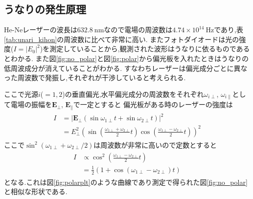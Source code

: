 \subsection{うなりの発生原理}
He-Neレーザーの波長は$632.8\ \si{\nano\metre}$なので電場の周波数は$4.74\times10^14\ \si{\hertz}$であり,表\ref{tab:unari_kihon}の周波数に比べて非常に高い.
またフォトダイオードは光の強度($I=|E_0|^2$)を測定していることから,観測された波形はうなりに依るものであるとわかる.
また図\ref{fig:no_polar}と図\ref{fig:polar}から偏光板を入れたときはうなりの低周波成分が消えていることがわかる.
すなわちレーザーは偏光成分ごとに異なった周波数で発振し,それぞれが干渉していると考えられる.

ここで光源$i$($=1,2$)の垂直偏光,水平偏光成分の周波数をそれぞれ$\omega_{i\perp}$, $\omega_{i\parallel}$として電場の振幅を$\bm{E}_\perp$, $\bm{E}_\parallel$で一定とすると
偏光板がある時のレーザーの強度は
\begin{align}
  \begin{split}
    I&=|\bm{E}_\perp(\sin\omega_{1\perp}t+\sin\omega_{2\perp}t)|^2\\
    &=E_\perp^2\left(\sin\left(\frac{\omega_{1\perp}+\omega_{2\perp}}{2}t\right)\cos\left(\frac{\omega_{1\perp}-\omega_{2\perp}}{2}t\right)\right)^2
  \end{split}
\end{align}
ここで$\sin^2(\omega_{1\perp}+\omega_{2\perp}/2)$は周波数が非常に高いので定数とすると
\begin{align}
  \label{equ:polar}
  \begin{split}
    I&\propto\cos^2\left(\frac{\omega_{1\perp}-\omega_{2\perp}}{2}t\right)\\
    &=\frac{1}{2}(1+\cos(\omega_{1\perp}-\omega_{2\perp})t)
  \end{split}
\end{align}
となる.これは図\ref{fig:polarplt}のような曲線であり測定で得られた図\ref{fig:no_polar}と相似な形状である.

